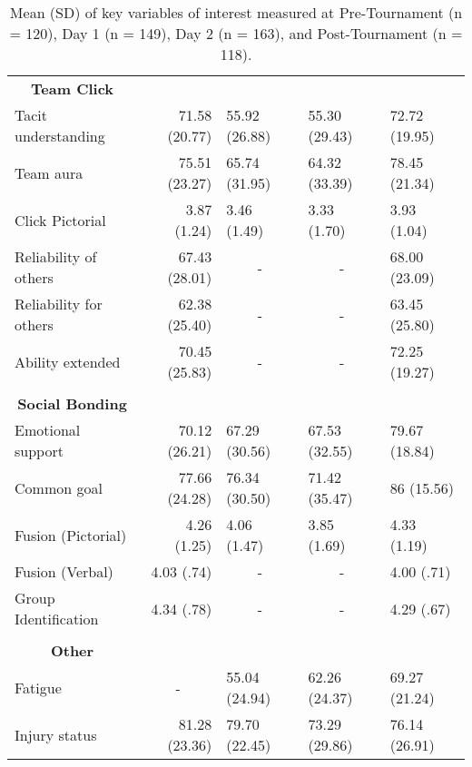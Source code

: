 \begin{table}[]
\begin{tabular}{@{}lrlll@{}}
\multicolumn{1}{c}{\textbf{Team Click}} &  &  &  &  \\
Tacit understanding & 71.58 (20.77) & 55.92 (26.88) & 55.30 (29.43) & 72.72 (19.95) \\
Team aura & 75.51 (23.27) & 65.74 (31.95) & 64.32 (33.39) & 78.45 (21.34) \\
Click Pictorial & 3.87 (1.24) & 3.46 (1.49) & 3.33 (1.70) & 3.93 (1.04) \\
Reliability of others & 67.43 (28.01) & \multicolumn{1}{c}{-} & \multicolumn{1}{c}{-} & 68.00 (23.09) \\
Reliability for others & 62.38 (25.40) & \multicolumn{1}{c}{-} & \multicolumn{1}{c}{-} & 63.45 (25.80) \\
Ability extended & 70.45 (25.83) & \multicolumn{1}{c}{-} & \multicolumn{1}{c}{-} & 72.25 (19.27) \\
 &  &  &  &  \\
\multicolumn{1}{c}{\textbf{Social Bonding}} &  &  &  &  \\
Emotional support & 70.12 (26.21) & 67.29 (30.56) & 67.53 (32.55) & 79.67 (18.84) \\
Common goal & 77.66 (24.28) & 76.34 (30.50) & 71.42 (35.47) & 86 (15.56) \\
Fusion (Pictorial) & 4.26 (1.25) & 4.06 (1.47) & 3.85 (1.69) & 4.33 (1.19) \\
Fusion (Verbal) & 4.03 (.74) & \multicolumn{1}{c}{-} & \multicolumn{1}{c}{-} & 4.00 (.71) \\
Group Identification & 4.34 (.78) & \multicolumn{1}{c}{-} & \multicolumn{1}{c}{-} & 4.29 (.67) \\
 &  &  &  &  \\
\multicolumn{1}{c}{\textbf{Other}} &  &  &  &  \\
Fatigue & \multicolumn{1}{c}{-} & 55.04 (24.94) & 62.26 (24.37) & 69.27 (21.24) \\
Injury status & 81.28 (23.36) & 79.70 (22.45) & 73.29 (29.86) & 76.14 (26.91) \\ \bottomrule
\end{tabular}
    
    
\caption{Mean (SD) of key variables of interest measured at Pre-Tournament (n = 120), Day 1 (n = 149), Day 2 (n = 163), and Post-Tournament (n = 118). }
\label{tab:rawVariablesByTime}
\end{table}

